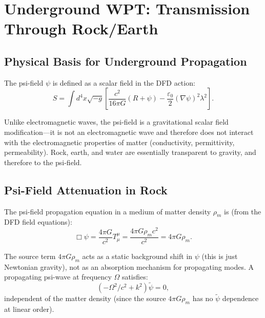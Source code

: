 \documentclass[aps,prd,twocolumn,superscriptaddress]{revtex4-2}
\begin{document}
\section{Underground WPT: Transmission Through Rock/Earth}
\label{sec:underground}

\subsection{Physical Basis for Underground Propagation}

The psi-field $\psi$ is defined as a scalar field in the DFD action:
\begin{equation}
S = \int d^4x\sqrt{-g}\left[\frac{c^2}{16\pi G}\left(R + \psi\right)
- \frac{\varepsilon_0}{2}(\nabla\psi)^2\lambda^2\right].
\label{eq:dfd_action}
\end{equation}

Unlike electromagnetic waves, the psi-field is a gravitational scalar
field modification---it is not an electromagnetic wave and therefore
does not interact with the electromagnetic properties of matter
(conductivity, permittivity, permeability).  Rock, earth, and water
are essentially transparent to gravity, and therefore to the psi-field.

\subsection{Psi-Field Attenuation in Rock}

The psi-field propagation equation in a medium of matter density $\rho_m$
is (from the DFD field equations):
\begin{equation}
\Box\psi = \frac{4\pi G}{c^2}T_\mu^\mu = \frac{4\pi G\rho_m c^2}{c^2} = 4\pi G\rho_m.
\label{eq:psi_eqn_rock}
\end{equation}

The source term $4\pi G\rho_m$ acts as a static background shift
in $\psi$ (this is just Newtonian gravity), not as an absorption mechanism
for propagating modes.  A propagating psi-wave at frequency $\Omega$
satisfies:
\begin{equation}
(-\Omega^2/c^2 + k^2)\tilde{\psi} = 0,
\label{eq:dispersion_vacuum}
\end{equation}
independent of the matter density (since the source $4\pi G\rho_m$
has no $\tilde{\psi}$ dependence at linear order).
\end{document}
